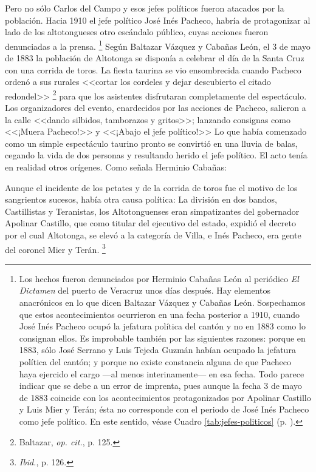 \documentclass[14pt,twoside,final]{extbook} %
\let\oldfootnote\footnote
\renewcommand\footnote[1]{%
\oldfootnote{\hspace{1mm}#1}}
\begin{document}
Pero no sólo Carlos del Campo y esos jefes políticos fueron atacados por la población. Hacia 1910 el jefe político José Inés Pacheco, habría de protagonizar al lado de los altotongueses otro escándalo público, cuyas acciones fueron denunciadas a la prensa.\footnote{Los hechos fueron denunciados por Herminio Cabañas León al periódico \emph{El Dictamen} del puerto de Veracruz unos días después. Hay elementos anacrónicos en lo que dicen Baltazar Vázquez y Cabañas León. Sospechamos que estos acontecimientos ocurrieron en una fecha posterior a 1910, cuando José Inés Pacheco ocupó la jefatura política del cantón y no en 1883 como lo consignan ellos. Es improbable también por las siguientes razones: porque en 1883, sólo José Serrano y Luis Tejeda Guzmán habían ocupado la jefatura política del cantón; y porque no existe constancia alguna de que Pacheco haya ejercido el cargo ---al menos interinamente--- en esa fecha. Todo parece indicar que se debe a un error de imprenta, pues aunque la fecha 3 de mayo de 1883 coincide con los acontecimientos protagonizados por Apolinar Castillo y Luis Mier y Terán; ésta no corresponde con el periodo de José Inés Pacheco como jefe político. En este sentido, véase Cuadro \ref{tab:jefes-politicos} (p. \pageref{tab:jefes-politicos}).} Según Baltazar Vázquez y Cabañas León, el 3 de mayo de 1883 la población de Altotonga se disponía a celebrar el día de la Santa Cruz con una corrida de toros. La fiesta taurina se vio ensombrecida cuando Pacheco ordenó a sus rurales <<cortar los cordeles y dejar descubierto el citado redondel>>\footnote{Baltazar, \emph{op. cit.}, p. 125.} para que los asistentes disfrutaran completamente del espectáculo. Los organizadores del evento, enardecidos por las acciones de Pacheco, salieron a la calle <<dando silbidos, tamborazos y gritos>>; lanzando consignas como <<¡Muera Pacheco!>> y <<¡Abajo el jefe político!>> Lo que había comenzado como un simple espectáculo taurino pronto se convirtió en una lluvia de balas, cegando la vida de dos personas y resultando herido el jefe político. El acto tenía en realidad otros orígenes. Como señala Herminio Cabañas:
\begin{quoting}
Aunque el incidente de los petates y de la corrida de toros fue el motivo de los sangrientos sucesos, había otra causa política: La división en dos bandos, Castillistas y Teranistas, los Altotonguenses eran simpatizantes del gobernador Apolinar Castillo, que como titular del ejecutivo del estado, expidió el decreto por el cual Altotonga, se elevó a la categoría de Villa, e Inés Pacheco, era gente del coronel Mier y Terán.\footnote{\emph{Ibid.}, p. 126.}
\end{quoting}
\end{document}
